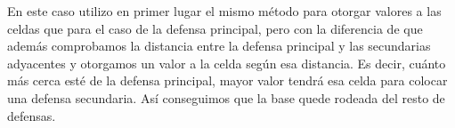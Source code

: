 En este caso utilizo en primer lugar el mismo método para otorgar valores a las celdas que para el caso de la defensa principal, pero con la diferencia de que además comprobamos la distancia entre la defensa principal y las secundarias adyacentes y otorgamos un valor a la celda según esa distancia. Es decir, cuánto más cerca esté de la defensa principal, mayor valor tendrá esa celda para colocar una defensa secundaria. Así conseguimos que la base quede rodeada del resto de defensas.